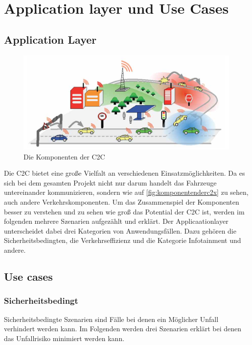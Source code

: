 \chapter{Application layer und Use Cases\label{chap:usecases}}
\section{Application Layer \label{sec:applicationLayer}}
\begin{figure}[htbp]
\includegraphics[width=0.99\textwidth]{content/images/06_use_cases/komponenten.png}
\caption{Die Komponenten der \acl{C2C}\cite{etsi102638}}
\label{fig:komponentenderc2x}
\end{figure}
Die \acl{C2C} bietet eine große Vielfalt an verschiedenen Einsatzmöglichkeiten. Da es sich bei dem gesamten Projekt nicht nur darum handelt das Fahrzeuge untereinander kommunizieren, sondern wie auf \autoref{fig:komponentenderc2x} zu sehen, auch andere Verkehrskomponenten. Um das Zusammenspiel der Komponenten besser zu verstehen und zu sehen wie groß das Potential der \acl{C2C} ist, werden im folgenden mehrere Szenarien aufgezählt und erklärt. Der Applicaationlayer unterscheidet dabei drei Kategorien von Anwendungsfällen. Dazu gehören die Sicherheitsbedingten, die Verkehrseffizienz und die Kategorie Infotainment und andere.

\section{Use cases}
\subsection{Sicherheitsbedingt}
Sicherheitsbedingte Szenarien sind Fälle bei denen ein Möglicher Unfall verhindert werden kann. Im Folgenden werden drei Szenarien erklärt bei denen das Unfallrisiko minimiert werden kann.

